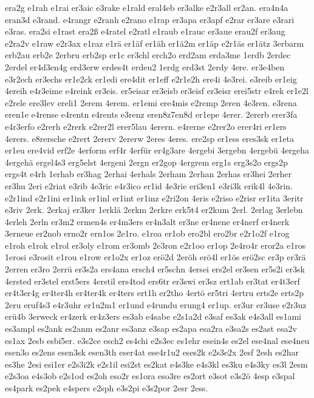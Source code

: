 {era2g
e1rah
e1rai
er3aic
e3rake
e1rald
eral4eb
er3alke
e2r3all
er2an.
era4n4a
eran3d
e3rand.
e4rangr
e2ranh
e2rano
e1rap
er3apa
er3apf
e2rar
er3are
e3rari
e3ras.
era2si
e1rast
era2ß
e4ratel
e2ratl
e1raub
e1rauc
er3aue
erau2f
er3aug
e2ra2v
e1raw
e2r3ax
e1raz
e1rä
er1äf
er1äh
er1ä2m
er1äp
e2r1äs
er1ätz
3erbarm
erb2au
erb2e
2erbru
erb2sp
er1c
er3chl
erch2o
erd2am
erda3me
1erdb
2erdec
2erdel
er4d3en4g
erd3erw
erdes4t
erdeu2
1erdg
erd3st
2erdy
4ere.
er3e4ben
e3r2ech
er3echs
er1e2ck
er1edi
ere4dit
er1eff
e2r1e2h
ere4i
4e3rei.
e3reib
er1eig
4ereih
e4r3eime
e4reink
er3eis.
er5eisar
er3eisb
er3eisf
er3eisr
erei5str
e4rek
er1e2l
e2rele
ere3lev
ereli1
2erem
4erem.
er1emi
ere4mis
e2remp
2eren
4e3ren.
e3rena
eren1e
e4rense
e4rentn
e4rents
e3renz
eren8z7en8d
er1epe
4erer.
2ererb
erer3fa
e4r3erfo
e2rerh
e2rerk
e2rer2l
erer5lau
4erern.
e4rerne
e2rer2o
erer4ri
er1ers
4erers.
e8rersche
e2rert
2ererv
2ererw
2eres
4eres.
ere2sp
er1ess
eres3sk
er1eta
er1eu
ere4vid
erf2e
4erform
erf4r
4erfür
er4g3are
4ergebi
3ergebn
4ergebü
4ergeha
4ergehä
ergel4s3
erg5elst
4ergeni
2ergn
er2gop
4ergrem
erg1s
erg3s2o
ergs2p
ergs4t
e4rh
1erhab
er3hag
2erhai
4erhals
2erham
2erhan
2erhas
er3hei
2erher
er3hu
2eri
e2riat
e3rib
4e3ric
e4r3ico
er1id
4e3rie
eri3en1
e3ri3k
erik4l
4e3rin.
e2r1ind
e2r1ini
er1ink
er1inl
er1int
er1inz
e2ri2on
4eris
e2riso
e2risr
er1ita
3eritr
e3riv
2erk.
2erkaj
er3ker
1erklä
2erkm
2erkre
erk5t4
er2kum
2erl.
2erlag
3erlebn
4erleh
2erln
er3m2
ermen4s
er4m3ers
er4n3alt
er3ne
er4nene
er4nerf
er4nerk
3erneue
er2nob
erno2r
ern1os
2e1ro.
e1roa
er1ob
ero2bl
ero2br
e2r1o2f
e1rog
e1roh
e1rok
e1rol
er3oly
e1rom
er3omb
2e3ron
e2r1oo
er1op
2e4ro4r
eror2a
e1ros
1erosi
e3rosit
e1rou
e1row
er1o2x
er1oz
erö2d
2eröh
erö4l
er1ös
erö2sc
er3p
er3rä
2erren
er3ro
2errü
er3s2a
ers4ana
ersch4
er5schn
4ersei
ers2el
er3sen
er5s2i
er3sk
4ersted
er3stel
erst5ers
4erstil
ers4tod
ers6tr
er3swi
er3sz
ert1ab
er3tat
er4t3erf
er4t3er4g
er4ter4h
er4ter4k
er4ters
ert1h
er2tho
4ertö
er5tri
4ertru
erts2e
erts2p
2eru
eruf4s3
e4r3uhr
er1u2m1
er1und
e4rundu
erung4
er1up.
er3ur
er3use
e2r3uz
erü4b
3erweck
er4zerk
er4z3ers
es3ab
e4sabe
e2s1a2d
e3saf
es3ak
e4s3all
es1ami
es3ampl
es2ank
es2anm
es2anr
es3anz
e3sap
es2apa
esa2ra
e3sa2s
es2ast
esa2v
es1ax
2esb
esbi5er.
e3s2ce
esch2
es4chi
e2s3ec
es1ehr
esein4s
es2el
ese4nal
ese4neu
esen3o
es2ens
esen3sk
esen3th
eser4at
ese4r1u2
eses2k
e2s3e2x
2esf
2esh
es2har
es3he
2esi
esi1er
e2s3i2k
e2s1il
esi2st
es2kat
e4s3ke
e4s3kl
es3ku
e4s3ky
es3l
2esm
e2s3oa
e4s3ob
e2s1od
es2oh
eso2r
es1ora
eso3re
es2ort
e3sot
e3s2ö
4esp
e3spal
es4park
es2pek
e4spers
e2sph
e3s2pi
e3s2por
2esr
2ess.
}
